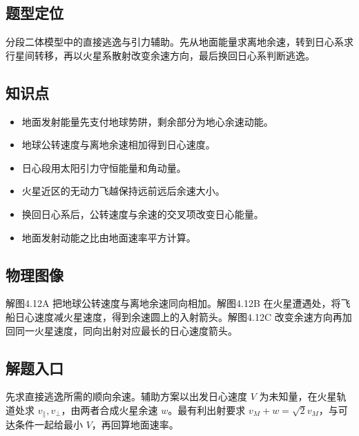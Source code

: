 \documentclass[UTF8,fontset=fandol,a4paper,11pt]{ctexart}
\begin{document}


\subsection*{题型定位}

分段二体模型中的直接逃逸与引力辅助。先从地面能量求离地余速，转到日心系求行星间转移，再以火星系散射改变余速方向，最后换回日心系判断逃逸。



\subsection*{知识点}

\begin{itemize}
\item 地面发射能量先支付地球势阱，剩余部分为地心余速动能。
\item 地球公转速度与离地余速相加得到日心速度。
\item 日心段用太阳引力守恒能量和角动量。
\item 火星近区的无动力飞越保持远前远后余速大小。
\item 换回日心系后，公转速度与余速的交叉项改变日心能量。
\item 地面发射动能之比由地面速率平方计算。
\end{itemize}




\subsection*{物理图像}

解图4.12A 把地球公转速度与离地余速同向相加。解图4.12B 在火星遭遇处，将飞船日心速度减火星速度，得到余速圆上的入射箭头。解图4.12C 改变余速方向再加回同一火星速度，同向出射对应最长的日心速度箭头。



\subsection*{解题入口}

先求直接逃逸所需的顺向余速。辅助方案以出发日心速度 $V$ 为未知量，在火星轨道处求 $v_\parallel,v_\perp$，由两者合成火星余速 $w$。最有利出射要求 $v_M+w=\sqrt2v_M$，与可达条件一起给最小 $V$，再回算地面速率。
\end{document}
